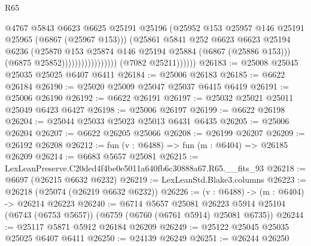 \begin{lexlean}{R65}
\begin{coremodule}
{                                            @4767
                                            @5843
                                            @6623
                                            @6625
                                            @25191
                                            @25196
                                            (@25952
                                              @153
                                              @25957
                                              @146
                                              @25191
                                              @25965
                                              (@6867 (@25967 @153)))
                                            (@25861
                                              @5841
                                              @252
                                              @6623
                                              @6623
                                              @25194
                                              @6236
                                              (@25870
                                                @153
                                                @25874
                                                @146
                                                @25194
                                                @25884
                                                (@6867 (@25886 @153)))
                                              (@6875 @25852)))))))))))))))))
              (@7082 @25211))))))
@26183 := @25008 @25045 @25035 @25025 @6407 @6411
@26184 := @25006 @26183
@26185 := @6622 @26184
@26190 := @25020 @25009 @25047 @25037 @6415 @6419
@26191 := @25006 @26190
@26192 := @6622 @26191
@26197 := @25032 @25021 @25011 @25049 @6423 @6427
@26198 := @25006 @26197
@26199 := @6622 @26198
@26204 := @25044 @25033 @25023 @25013 @6431 @6435
@26205 := @25006 @26204
@26207 := @6622 @26205 @25066
@26208 := @26199 @26207
@26209 := @26192 @26208
@26212 := fun (v : @6488) => fun (m : @6404) => @26185 @26209
@26214 := @6683 @5657 @25081
@26215 := LexLeanPreserve.C20ded4f4be0e5011a640fb6c30888a67.R65.__fits_93
@26218 := @6697 (@26215 @6632 @6232)
@26219 := LexLeanStd.Blake3.columns
@26223 := @26218 (@25074 (@26219 @6632 @6232))
@26226 := (v : @6488) -> (m : @6404) -> @26214 @26223
@26240 := @6714
    @5657
    @25081
    @26223
    @5914
    @25104
    (@6743 (@6753 @5657))
    (@6759 (@6760 (@6761 @5914) @25081 @6735))
@26244 := @25117 @5871 @5912 @26184 @26209
@26249 := @25122 @25045 @25035 @25025 @6407 @6411
@26250 := @24139 @26249
@26251 := @26244 @26250
}
\end{coremodule}
\end{lexlean}
